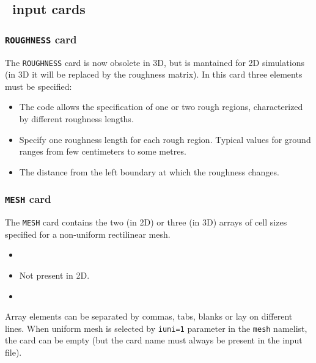 \subsection{\PDAC\ input cards}
\label{section:cards}
\subsubsection{{\tt ROUGHNESS} card}

The {\tt ROUGHNESS} card is now obsolete in 3D, but is mantained for 2D 
simulations (in 3D it will be replaced by the roughness matrix). In this
card three elements must be specified:
\begin{itemize}
\item
{}
{The code allows the specification of one or two rough regions, characterized
by different roughness lengths.}

\item
{}
{Specify one roughness length for each rough region. Typical values for ground
ranges from few centimeters to some metres.}

\item
{}
{The distance from the left boundary at which the roughness changes.}

\end{itemize}

\subsubsection{{\tt MESH} card}

The {\tt MESH} card contains the two (in 2D) or three (in 3D) arrays of cell 
sizes specified for a non-uniform rectilinear mesh. 

\begin{itemize}
\item
{}
{}

\item
{}
{Not present in 2D.}

\item
{}
{}
\end{itemize}

Array elements can be separated by commas, tabs, blanks or lay on different
lines.  When uniform mesh is selected by {\tt iuni=1} parameter in the 
{\tt mesh} namelist, the card can be empty (but the card 
name must always be present in the input file).

